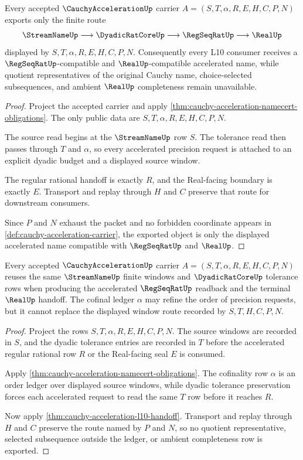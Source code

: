 \begin{theorem}
\label{thm:cauchy-acceleration-l10-handoff}
Every accepted $\CauchyAccelerationUp$ carrier $A=(S,T,\alpha,R,E,H,C,P,N)$ exports only the finite route
$$
\StreamNameUp \longrightarrow \DyadicRatCoreUp \longrightarrow \RegSeqRatUp \longrightarrow \RealUp
$$
displayed by $S,T,\alpha,R,E,H,C,P,N$. Consequently every L10 consumer receives a $\RegSeqRatUp$-compatible and $\RealUp$-compatible accelerated name, while quotient representatives of the original Cauchy name, choice-selected subsequences, and ambient $\RealUp$ completeness remain unavailable.
\end{theorem}
\begin{proof}
Project the accepted carrier and apply \autoref{thm:cauchy-acceleration-namecert-obligations}. The only public data are $S,T,\alpha,R,E,H,C,P,N$.

The source read begins at the $\StreamNameUp$ row $S$. The tolerance read then passes through $T$ and $\alpha$, so every accelerated precision request is attached to an explicit dyadic budget and a displayed source window.

The regular rational handoff is exactly $R$, and the Real-facing boundary is exactly $E$. Transport and replay through $H$ and $C$ preserve that route for downstream consumers.

Since $P$ and $N$ exhaust the packet and no forbidden coordinate appears in \autoref{def:cauchy-acceleration-carrier}, the exported object is only the displayed accelerated name compatible with $\RegSeqRatUp$ and $\RealUp$.
\end{proof}

\begin{theorem}
\label{thm:cauchy-acceleration-rectangular-window-route}
Every accepted $\CauchyAccelerationUp$ carrier $A=(S,T,\alpha,R,E,H,C,P,N)$ reuses the same $\StreamNameUp$ finite windows and $\DyadicRatCoreUp$ tolerance rows when producing the accelerated $\RegSeqRatUp$ readback and the terminal $\RealUp$ handoff. The cofinal ledger $\alpha$ may refine the order of precision requests, but it cannot replace the displayed window route recorded by $S,T,H,C,P,N$.
\end{theorem}
\begin{proof}
Project the rows $S,T,\alpha,R,E,H,C,P,N$. The source windows are recorded in $S$, and the dyadic tolerance entries are recorded in $T$ before the accelerated regular rational row $R$ or the Real-facing seal $E$ is consumed.

Apply \autoref{thm:cauchy-acceleration-namecert-obligations}. The cofinality row $\alpha$ is an order ledger over displayed source windows, while dyadic tolerance preservation forces each accelerated request to read the same $T$ row before it reaches $R$.

Now apply \autoref{thm:cauchy-acceleration-l10-handoff}. Transport and replay through $H$ and $C$ preserve the route named by $P$ and $N$, so no quotient representative, selected subsequence outside the ledger, or ambient completeness row is exported.
\end{proof}

